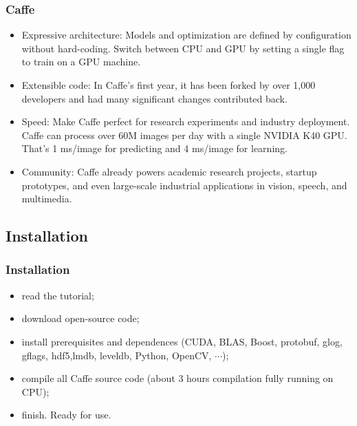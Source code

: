 \documentclass[10pt, mathserif]{beamer}	%
\newcommand{\ftitle}[1]{\frametitle{\hspace{4ex} {#1}}}	%
\begin{document}
\begin{CJK}{UTF8}{song}
\begin{frame}
	\ftitle{Caffe}
	\begin{itemize}
		\item Expressive architecture: Models and optimization are defined by configuration without hard-coding. Switch between CPU and GPU by setting a single flag to train on a GPU machine.
		\item Extensible code: In Caffe's first year, it has been forked by over 1,000 developers and had many significant changes contributed back.
		\item Speed: Make Caffe perfect for research experiments and industry deployment. Caffe can process over 60M images per day with a single NVIDIA K40 GPU. That's 1 ms/image for predicting and 4 ms/image for learning.
		\item Community: Caffe already powers academic research projects, startup prototypes, and even large-scale industrial applications in vision, speech, and multimedia.
	\end{itemize}
\end{frame}


\subsection{Installation}
\begin{frame}
	\ftitle{Installation}
	\begin{itemize}
		\item read the tutorial;
		\item download open-source code;
		\item install prerequisites and dependences (CUDA, BLAS, Boost, protobuf, glog, gflags, hdf5,lmdb, leveldb, Python, OpenCV, $\cdots$);
		\item compile all Caffe source code (about 3 hours compilation fully running on CPU);
		\item finish. Ready for use.
	\end{itemize}
\end{frame}


\end{CJK}
\end{document}
